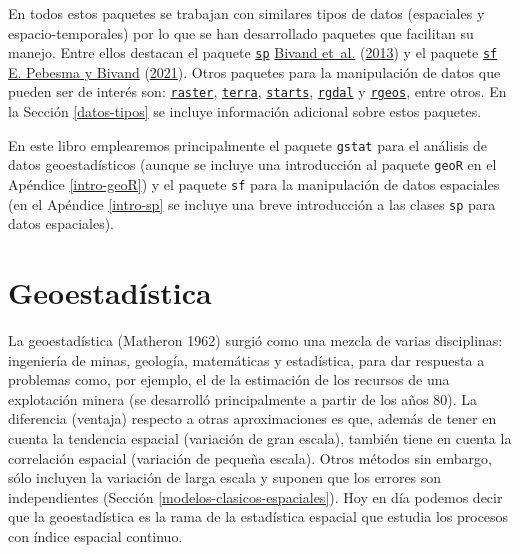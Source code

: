 \documentclass[
  spanish,
]{book}
\theoremstyle{break}
\theoremstyle{definition}
\theoremstyle{definition}
\theoremstyle{definition}
\theoremstyle{definition}
\theoremstyle{remark}
\begin{document}
En todos estos paquetes se trabajan con similares tipos de datos (espaciales y espacio-temporales) por lo que se han desarrollado paquetes que facilitan su manejo.
Entre ellos destacan el paquete \href{https://CRAN.R-project.org/package=sp}{\texttt{sp}} \protect\hyperlink{ref-Bivand2013}{Bivand et~al.} (\protect\hyperlink{ref-Bivand2013}{2013}) y el paquete \href{https://r-spatial.github.io/sf}{\texttt{sf}} \protect\hyperlink{ref-Pebesma2021}{E. Pebesma y Bivand} (\protect\hyperlink{ref-Pebesma2021}{2021}).
Otros paquetes para la manipulación de datos que pueden ser de interés son: \href{https://CRAN.R-project.org/package=raster}{\texttt{raster}}, \href{https://CRAN.R-project.org/package=terra}{\texttt{terra}}, \href{https://r-spatial.github.io/stars}{\texttt{starts}}, \href{https://CRAN.R-project.org/package=rgdal}{\texttt{rgdal}} y \href{https://CRAN.R-project.org/package=rgeos}{\texttt{rgeos}}, entre otros.
En la Sección \ref{datos-tipos} se incluye información adicional sobre estos paquetes.

En este libro emplearemos principalmente el paquete \texttt{gstat} para el análisis de datos geoestadísticos (aunque se incluye una introducción al paquete \texttt{geoR} en el Apéndice \ref{intro-geoR}) y el paquete \texttt{sf} para la manipulación de datos espaciales (en el Apéndice \ref{intro-sp} se incluye una breve introducción a las clases \texttt{sp} para datos espaciales).

\hypertarget{geoestadistica}{%
\section{Geoestadística}\label{geoestadistica}}

La geoestadística (Matheron 1962) surgió como una mezcla de varias disciplinas: ingeniería de minas, geología, matemáticas y estadística, para dar respuesta a problemas como, por ejemplo, el de la estimación de los recursos de una explotación minera (se desarrolló principalmente a partir de los años 80).
La diferencia (ventaja) respecto a otras aproximaciones es que, además de tener en cuenta la tendencia espacial (variación de gran escala), también tiene en cuenta la correlación espacial (variación de pequeña escala).
Otros métodos sin embargo, sólo incluyen la variación de larga escala y suponen que los errores son independientes (Sección \ref{modelos-clasicos-espaciales}).
Hoy en día podemos decir que la geoestadística es la rama de la estadística espacial que estudia los procesos con índice espacial continuo.
\end{document}
